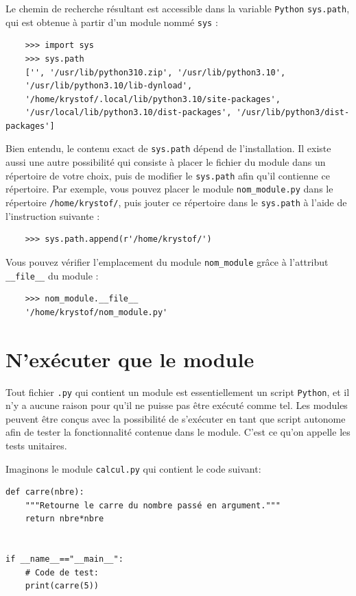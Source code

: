 \documentclass[a4paper,12pt]{book}
\begin{document}
Le chemin de recherche résultant est accessible dans la variable \texttt{Python} \texttt{sys.path}, qui est obtenue à partir d'un module nommé \texttt{sys} :
\begin{verbatim}
    >>> import sys
    >>> sys.path
    ['', '/usr/lib/python310.zip', '/usr/lib/python3.10', 
    '/usr/lib/python3.10/lib-dynload', 
    '/home/krystof/.local/lib/python3.10/site-packages', 
    '/usr/local/lib/python3.10/dist-packages', '/usr/lib/python3/dist-packages']
\end{verbatim}
\medskip

Bien entendu, le contenu exact de \texttt{sys.path} dépend de l'installation. Il existe aussi une autre possibilité qui consiste à placer le fichier du module dans un répertoire de votre choix, puis de modifier le \texttt{sys.path} afin qu'il contienne ce répertoire. Par exemple, vous pouvez placer le module \texttt{nom\_module.py} dans le répertoire \texttt{/home/krystof/}, puis jouter ce répertoire dans le \texttt{sys.path} à l'aide de l'instruction suivante :
\begin{verbatim}
    >>> sys.path.append(r'/home/krystof/')
\end{verbatim}
\medskip

Vous pouvez vérifier l'emplacement du module \texttt{nom\_module} grâce à l'attribut \texttt{\_\_file\_\_} du module :
\begin{verbatim}
    >>> nom_module.__file__
    '/home/krystof/nom_module.py'
\end{verbatim}
\medskip

\section{N'exécuter que le module}
Tout fichier \texttt{.py} qui contient un module est essentiellement un script \texttt{Python}, et il n'y a aucune raison pour qu'il ne puisse pas être exécuté comme tel. Les modules peuvent être conçus avec la possibilité de s'exécuter en tant que script autonome afin de tester la fonctionnalité contenue dans le module. C'est ce qu'on appelle les tests unitaires.
\medskip

Imaginons le module \texttt{calcul.py} qui contient le code suivant:
\begin{lstlisting}[caption=Module \texttt{calcul.py}]
def carre(nbre):
	"""Retourne le carre du nombre passé en argument."""
	return nbre*nbre


if __name__=="__main__":
	# Code de test:
    print(carre(5))
\end{lstlisting}
\medskip
\end{document}
